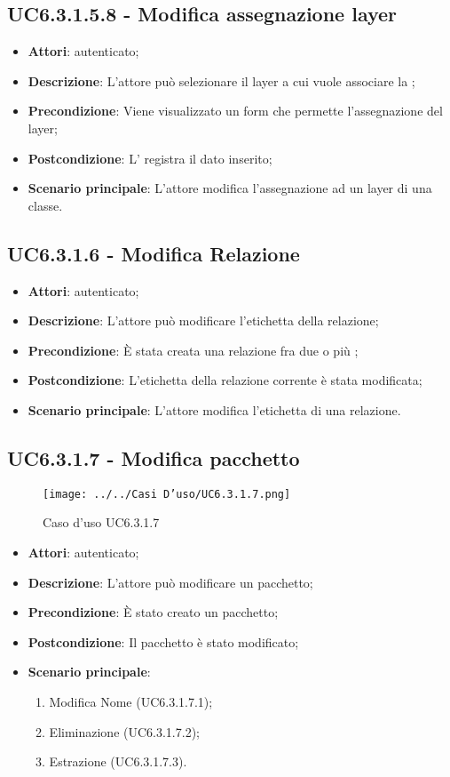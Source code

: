 \subsection{UC6.3.1.5.8 - Modifica assegnazione layer}
\label{ssec:UC6.3.1.5.8}
\begin{itemize}
\item \textbf{Attori}:  autenticato;
\item \textbf{Descrizione}: L'attore può selezionare il layer a cui vuole associare la ;
\item \textbf{Precondizione}: Viene visualizzato un form che permette l'assegnazione del layer;
\item \textbf{Postcondizione}: L' registra il dato inserito;
\item \textbf{Scenario principale}: L'attore modifica l'assegnazione ad un layer di una classe.
\end{itemize}
\subsection{UC6.3.1.6 - Modifica Relazione}
\label{ssec:UC6.3.1.6}
\begin{itemize}
\item \textbf{Attori}:  autenticato;
\item \textbf{Descrizione}: L'attore può modificare l'etichetta della relazione;
\item \textbf{Precondizione}: È stata creata una relazione fra due o più ;
\item \textbf{Postcondizione}: L'etichetta della relazione corrente è stata modificata;
\item \textbf{Scenario principale}: L'attore modifica l'etichetta di una relazione.
\end{itemize}
\subsection{UC6.3.1.7 - Modifica pacchetto}
\label{ssec:UC6.3.1.7}
\begin{figure}[h!]
\centering
\texttt{[image: ../../Casi D'uso/UC6.3.1.7.png]}
\caption{Caso d'uso UC6.3.1.7}
 \end{figure}
\begin{itemize}
\item \textbf{Attori}:  autenticato;
\item \textbf{Descrizione}: L'attore può modificare un pacchetto;
\item \textbf{Precondizione}: È stato creato un pacchetto;
\item \textbf{Postcondizione}: Il pacchetto è stato modificato;
\item \textbf{Scenario principale}: \begin{enumerate}\item Modifica Nome (UC6.3.1.7.1);\item Eliminazione  (UC6.3.1.7.2);\item Estrazione  (UC6.3.1.7.3).
 \end{enumerate}
\end{itemize}
